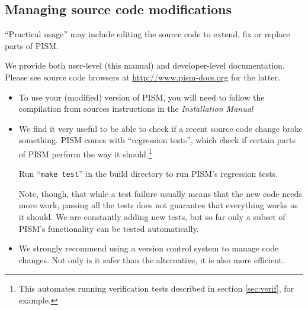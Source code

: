 \subsection{Managing source code modifications}
\label{sec:code-modifications}

``Practical usage'' may include editing the source code to extend, fix
or replace parts of PISM.

We provide both user-level (this manual) and developer-level documentation.
Please see source code browsers at \url{http://www.pism-docs.org} for the latter.

\begin{itemize}
\item To use your (modified) version of PISM, you will need to follow the
  compilation from sources instructions in the \emph{Installation Manual}
\item We find it very useful to be able to check if a recent source code change
  broke something. PISM comes with ``regression tests'', which check if certain
  parts of PISM perform the way it should.\footnote{This automates running
    verification tests described in section \ref{sec:verif}, for example.}

  Run ``\texttt{make test}'' in the build directory to run PISM's regression tests.

  Note, though, that while a test failure usually means that the new code needs
  more work, passing all the tests does not guarantee that everything works as
  it should. We are constantly adding new tests, but so far only a subset
  of PISM's functionality can be tested automatically.
\item We strongly recommend using a version control system to manage code
  changes. Not only is it safer than the alternative, it is also more efficient.
\end{itemize}


